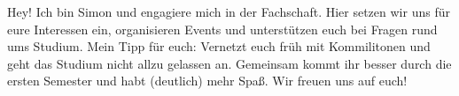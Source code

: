 \begin{multicols}{2}

\vspace{-0.1cm}

{
Hey! Ich bin Simon und engagiere mich in der Fachschaft. Hier setzen wir uns für eure Interessen ein, organisieren Events und unterstützen euch bei Fragen rund ums Studium. Mein Tipp für euch: Vernetzt euch früh mit Kommilitonen und geht das Studium nicht allzu gelassen an. Gemeinsam kommt ihr besser durch die ersten Semester und habt (deutlich) mehr Spaß. Wir freuen uns auf euch! 
}



\end{multicols}
